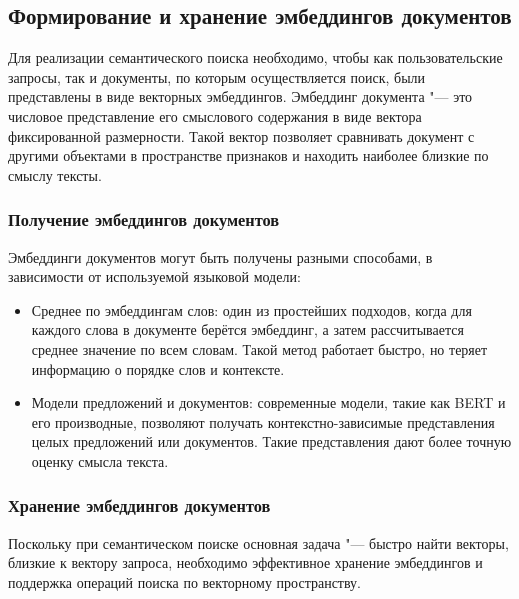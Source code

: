 \documentclass[coursework]{SCWorks}
\begin{document}
\subsection{Формирование и хранение эмбеддингов документов}

Для реализации семантического поиска необходимо, чтобы как пользовательские запросы, так и документы, по которым осуществляется поиск, были представлены в виде векторных эмбеддингов. Эмбеддинг документа "--- это числовое представление его смыслового содержания в виде вектора фиксированной размерности. Такой вектор позволяет сравнивать документ с другими объектами в пространстве признаков и находить наиболее близкие по смыслу тексты\cite{ye2016word}.

\subsubsection{Получение эмбеддингов документов}
Эмбеддинги документов могут быть получены разными способами, в зависимости от используемой языковой модели:
\begin{itemize}
    \item 
    Среднее по эмбеддингам слов: один из простейших подходов, когда для каждого слова в документе берётся эмбеддинг, а затем рассчитывается среднее значение по всем словам. Такой метод работает быстро, но теряет информацию о порядке слов и контексте.
    
    \item Модели предложений и документов: современные модели, такие как BERT и его производные, позволяют получать контекстно-зависимые представления целых предложений или документов. Такие представления дают более точную оценку смысла текста.
\end{itemize}

\subsubsection{Хранение эмбеддингов документов}
Поскольку при семантическом поиске основная задача "--- быстро найти векторы, близкие к вектору запроса, необходимо эффективное хранение эмбеддингов и поддержка операций поиска по векторному пространству.
\end{document}

